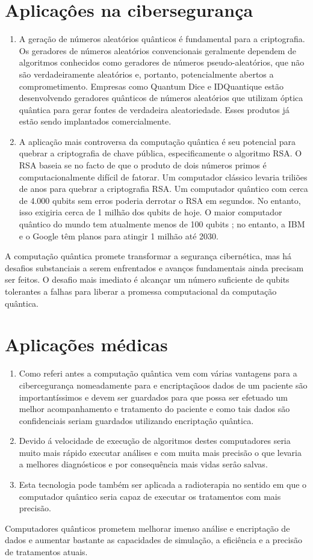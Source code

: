 \documentclass{report}
\begin{document}
\section{Aplicaçôes na cibersegurança}
\begin{enumerate}
    \item A geração de números aleatórios quânticos é fundamental para a criptografia. Os geradores de números aleatórios convencionais geralmente dependem de algoritmos conhecidos como geradores de números pseudo-aleatórios, que não são verdadeiramente aleatórios e, portanto, potencialmente abertos a comprometimento. Empresas como Quantum Dice e IDQuantique estão desenvolvendo geradores quânticos de números aleatórios que utilizam óptica quântica para gerar fontes de verdadeira aleatoriedade. Esses produtos já estão sendo implantados comercialmente.
    \item A aplicação mais controversa da computação quântica é seu potencial para quebrar a criptografia de chave pública, especificamente o algoritmo RSA.
    O RSA baseia se no facto de que o produto de dois números primos é computacionalmente difícil de fatorar. Um computador clássico levaria triliões de anos para quebrar a criptografia RSA. Um computador quântico com cerca de 4.000 qubits sem erros poderia derrotar o RSA em segundos. No entanto, isso exigiria cerca de 1 milhão dos qubits de hoje. O maior computador quântico do mundo tem atualmente menos de 100 qubits ; no entanto, a IBM e o Google têm planos para atingir 1 milhão até 2030.
\end{enumerate}
A computação quântica promete transformar a segurança cibernética, mas há desafios substanciais a serem enfrentados e avanços fundamentais ainda precisam ser feitos. O desafio mais imediato é alcançar um número suficiente de qubits tolerantes a falhas para liberar a promessa computacional da computação quântica.
\section{Aplicações médicas}
\begin{enumerate}
    \item Como referi antes a computação quântica vem com várias vantagens para a cibercegurança nomeadamente para e encriptaçãoos dados de um paciente são importantíssimos e devem ser guardados para que possa ser efetuado um melhor acompanhamento e tratamento do paciente e como tais dados são confidenciais seriam guardados utilizando encriptação quântica.
    \item Devido á velocidade de execução de algoritmos destes computadores seria muito mais rápido executar análises e com muita mais precisão o que levaria a melhores diagnósticos e por consequência mais vidas serâo salvas.
    \item Esta tecnologia pode também ser aplicada a radioterapia no sentido em que o computador quântico seria capaz de executar os tratamentos com mais precisão.
\end{enumerate}
Computadores quânticos prometem melhorar imenso análise e encriptação de dados e aumentar bastante as capacidades de simulação, a eficiência e a precisão de tratamentos atuais.
\end{document}
